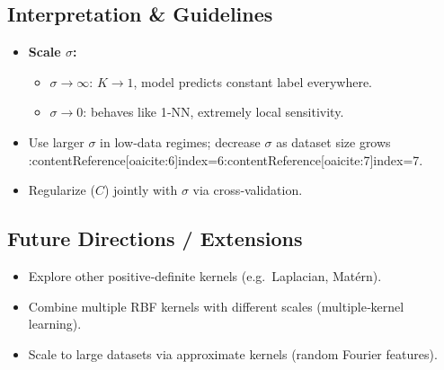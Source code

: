 \documentclass[11pt]{article}
\begin{document}
\subsection{Interpretation \& Guidelines}
\begin{itemize}
  \item \textbf{Scale $\sigma$:}  
    \begin{itemize}
      \item $\sigma\to\infty$: $K\to1$, model predicts constant label everywhere.  
      \item $\sigma\to0$: behaves like 1‐NN, extremely local sensitivity.
    \end{itemize}
  \item Use larger $\sigma$ in low‐data regimes; decrease $\sigma$ as dataset size grows :contentReference[oaicite:6]{index=6}:contentReference[oaicite:7]{index=7}.
  \item Regularize ($C$) jointly with $\sigma$ via cross‐validation.
\end{itemize}

\subsection{Future Directions / Extensions}
\begin{itemize}
  \item Explore other positive‐definite kernels (e.g.\ Laplacian, Matérn).  
  \item Combine multiple RBF kernels with different scales (multiple‐kernel learning).  
  \item Scale to large datasets via approximate kernels (random Fourier features).
\end{itemize}
\end{document}
